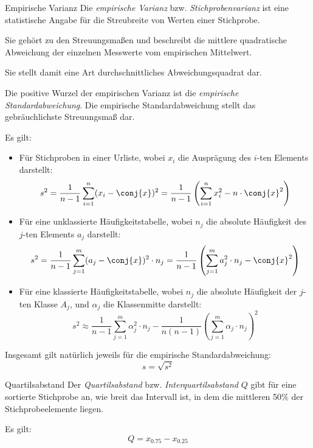 \begin{defi}{Empirische Varianz}
    Die \emph{empirische Varianz} bzw. \emph{Stichprobenvarianz}  ist eine statistische Angabe für die Streubreite von Werten einer Stichprobe.

    Sie gehört zu den Streuungsmaßen und beschreibt die mittlere quadratische Abweichung der einzelnen Messwerte vom empirischen Mittelwert.

    Sie stellt damit eine Art durchschnittliches Abweichungsquadrat dar.

    Die positive Wurzel der empirischen Varianz ist die \emph{empirische Standardabweichung}.
    Die empirische Standardabweichung stellt das gebräuchlichste Streuungsmaß dar.

    Es gilt:
    \begin{itemize}
        \item Für Stichproben in einer Urliste, wobei $x_i$ die Ausprägung des $i$-ten Elements darstellt:
              \[
                  s^2 = \frac{1}{n-1} \sum_{i=1}^{n} (x_i - \conj{x})^2 = \frac{1}{n-1} \left( \sum_{i=1}^{n} x_i^2 - n\cdot \conj{x}^2 \right)
              \]
        \item Für eine unklassierte Häufigkeitstabelle, wobei $n_j$ die absolute Häufigkeit des $j$-ten Elements $a_j$ darstellt:
              \[
                  s^2 = \frac{1}{n-1} \sum_{j=1}^{m} (a_j - \conj{x})^2 \cdot n_j = \frac{1}{n-1} \left( \sum_{j=1}^{m} a_j^2 \cdot n_j - \conj{x}^2 \right)
              \]
        \item Für eine klassierte Häufigkeitstabelle, wobei $n_j$ die absolute Häufigkeit der $j$-ten Klasse $A_j$, und $\alpha_j$ die Klassenmitte darstellt:
              \[
                  s^2 \approx \frac{1}{n-1} \sum_{j=1}^{m} \alpha_j^2 \cdot n_j - \frac{1}{n(n-1)} \left( \sum_{j=1}^{m} \alpha_j \cdot n_j \right)^2
              \]
    \end{itemize}

    Insgesamt gilt natürlich jeweils für die empirische Standardabweichung:
    \[
        s = \sqrt{s^2}
    \]
\end{defi}

\begin{defi}{Quartilsabstand}
    Der \emph{Quartilsabstand} bzw. \emph{Interquartilsabstand} $Q$ gibt für eine sortierte Stichprobe an, wie breit das Intervall ist, in dem die mittleren 50\% der Stichprobeelemente liegen.

    Es gilt:
    \[
        Q = x_{0.75} - x_{0.25}
    \]
\end{defi}

